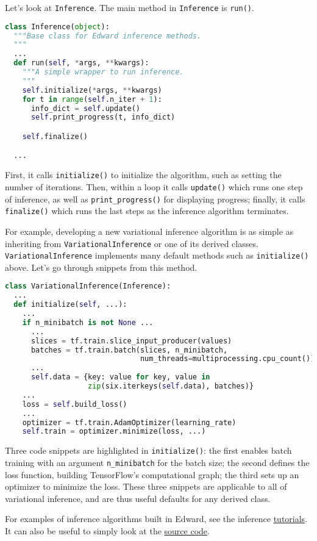 Let's look at \texttt{Inference}. The main method in
\texttt{Inference} is \texttt{run()}.

\begin{lstlisting}[language=Python]
class Inference(object):
  """Base class for Edward inference methods.
  """
  ...
  def run(self, *args, **kwargs):
    """A simple wrapper to run inference.
    """
    self.initialize(*args, **kwargs)
    for t in range(self.n_iter + 1):
      info_dict = self.update()
      self.print_progress(t, info_dict)

    self.finalize()

  ...
\end{lstlisting}

First, it calls \texttt{initialize()} to initialize the algorithm, such as
setting the number of iterations. Then, within a loop it calls
\texttt{update()} which runs one step of inference, as well as
\texttt{print_progress()} for displaying progress; finally, it
calls \texttt{finalize()} which runs the last steps as the inference
algorithm terminates.

For example, developing a new variational inference algorithm is as simple as
inheriting from \texttt{VariationalInference} or one of its derived
classes. \texttt{VariationalInference} implements many default methods such
as \texttt{initialize()} above. Let's go through snippets from this method.

\begin{lstlisting}[language=Python]
class VariationalInference(Inference):
  ...
  def initialize(self, ...):
    ...
    if n_minibatch is not None ...
      ...
      slices = tf.train.slice_input_producer(values)
      batches = tf.train.batch(slices, n_minibatch,
                               num_threads=multiprocessing.cpu_count())
      ...
      self.data = {key: value for key, value in
                   zip(six.iterkeys(self.data), batches)}
    ...
    loss = self.build_loss()
    ...
    optimizer = tf.train.AdamOptimizer(learning_rate)
    self.train = optimizer.minimize(loss, ...)
\end{lstlisting}

Three code snippets are highlighted in \texttt{initialize()}: the first
enables batch training with an argument \texttt{n_minibatch} for the batch
size; the second defines the loss function, building TensorFlow's
computational graph; the third sets up an optimizer to minimize the
loss. These three snippets are applicable to all of variational
inference, and are thus useful defaults for any derived class.

For examples of inference algorithms built in Edward, see the inference
\href{/tutorials/}{tutorials}. It can also be useful to simply look at
the
\href{https://github.com/blei-lab/edward/tree/master/edward/inferences}
{source code}.
